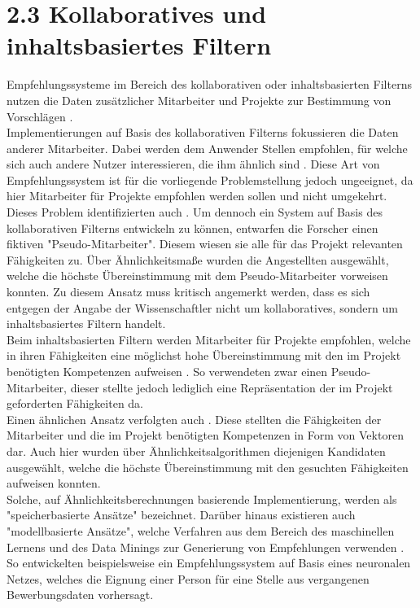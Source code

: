 \section[Kollaboratives und inhaltsbasiertes Filtern]{2.3 Kollaboratives und inhaltsbasiertes Filtern}
\label{ch:standDerForschung:cfundcb}
Empfehlungssysteme im Bereich des kollaborativen oder inhaltsbasierten Filterns nutzen die Daten zusätzlicher Mitarbeiter und Projekte zur Bestimmung von Vorschlägen \cite[S. 8]{recommenderSystems:2016}.\\
Implementierungen auf Basis des kollaborativen Filterns fokussieren die Daten anderer Mitarbeiter. Dabei werden dem Anwender Stellen empfohlen, für welche sich auch andere Nutzer interessieren, die ihm ähnlich sind \cite[S. 3]{jobMatcher:2020}. Diese Art von Empfehlungssystem ist für die vorliegende Problemstellung jedoch ungeeignet, da hier Mitarbeiter für Projekte empfohlen werden sollen und nicht umgekehrt. Dieses Problem identifizierten auch \textcite[S. 2]{mitre:2014}. Um dennoch ein System auf Basis des kollaborativen Filterns entwickeln zu können, entwarfen die Forscher einen fiktiven "Pseudo-Mitarbeiter". Diesem wiesen sie alle für das Projekt relevanten Fähigkeiten zu. Über Ähnlichkeitsmaße wurden die Angestellten ausgewählt, welche die höchste Übereinstimmung mit dem Pseudo-Mitarbeiter vorweisen konnten. Zu diesem Ansatz muss kritisch angemerkt werden, dass es sich entgegen der Angabe der Wissenschaftler nicht um kollaboratives, sondern um inhaltsbasiertes Filtern handelt.\\
Beim inhaltsbasierten Filtern werden Mitarbeiter für Projekte empfohlen, welche in ihren Fähigkeiten eine möglichst hohe Übereinstimmung mit den im Projekt benötigten Kompetenzen aufweisen \cite[S. 139]{recommenderSystems:2016}. So verwendeten \textcite[S. 2]{mitre:2014} zwar einen Pseudo-Mitarbeiter, dieser stellte jedoch lediglich eine Repräsentation der im Projekt geforderten Fähigkeiten da.\\
Einen ähnlichen Ansatz verfolgten auch \textcite[S. 6ff.]{buildingVectorRepresentations:2020}. Diese stellten die Fähigkeiten der Mitarbeiter und die im Projekt benötigten Kompetenzen in Form von Vektoren dar. Auch hier wurden über Ähnlichkeitsalgorithmen diejenigen Kandidaten ausgewählt, welche die höchste Übereinstimmung mit den gesuchten Fähigkeiten aufweisen konnten.\\
Solche, auf Ähnlichkeitsberechnungen basierende Implementierung, werden als "speicherbasierte Ansätze" bezeichnet. Darüber hinaus existieren auch "modellbasierte Ansätze", welche Verfahren aus dem Bereich des maschinellen Lernens und des Data Minings zur Generierung von Empfehlungen verwenden \cite[S. 9]{recommenderSystems:2016}. So entwickelten beispielsweise \textcite[S. 5ff.]{personJobFit:2018} ein Empfehlungssystem auf Basis eines neuronalen Netzes, welches die Eignung einer Person für eine Stelle aus vergangenen Bewerbungsdaten vorhersagt.\\
